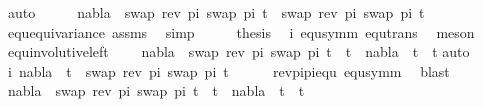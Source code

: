 \begin{isabellebody}
\ auto\isanewline
\ \ \isamarkupfalse%
\ \isamarkupfalse%
\ {\isachardoublequoteopen}nabla\ {\isasymturnstile}\ swap\ {\isacharparenleft}{\kern0pt}rev\ pi{\isacharparenright}{\kern0pt}\ {\isacharparenleft}{\kern0pt}swap\ pi\ t{}{\isacharparenright}{\kern0pt}\ {\isasymapprox}\ swap\ {\isacharparenleft}{\kern0pt}rev\ pi{\isacharparenright}{\kern0pt}\ {\isacharparenleft}{\kern0pt}swap\ pi\ t{}{\isacharparenright}{\kern0pt}{\isachardoublequoteclose}\isanewline
\ \ \ \ \isamarkupfalse%
\ equ{\isacharunderscore}{\kern0pt}equivariance\ assms\ \isamarkupfalse%
\ simp\isanewline
\ \ \isamarkupfalse%
\ \isamarkupfalse%
\ {\isacharquery}{\kern0pt}thesis\ \isamarkupfalse%
\ i\ equ{\isacharunderscore}{\kern0pt}symm\ equ{\isacharunderscore}{\kern0pt}trans\ \isamarkupfalse%
\ meson\ \isanewline
{}\isamarkupfalse%
%
\endisatagproof
{\isafoldproof}%
%
\isadelimproof
\isanewline
%
\endisadelimproof
\isanewline
{}\isamarkupfalse%
\ equ{\isacharunderscore}{\kern0pt}involutive{\isacharunderscore}{\kern0pt}left{\isacharcolon}{\kern0pt}\ \isanewline
\ \ \ {\isachardoublequoteopen}nabla\ {\isasymturnstile}\ swap\ {\isacharparenleft}{\kern0pt}rev\ pi{\isacharparenright}{\kern0pt}\ {\isacharparenleft}{\kern0pt}swap\ pi\ t{}{\isacharparenright}{\kern0pt}\ {\isasymapprox}\ t{}\ {\isacharequal}{\kern0pt}\ nabla\ {\isasymturnstile}\ t{}\ {\isasymapprox}\ t{}{\isachardoublequoteclose}\isanewline
%
\isadelimproof
%
\endisadelimproof
%
\isatagproof
{}\isamarkupfalse%
{\isacharparenleft}{\kern0pt}auto{\isacharparenright}{\kern0pt}\isanewline
\ \ \isamarkupfalse%
\ i{\isacharcolon}{\kern0pt}\ {\isachardoublequoteopen}nabla\ {\isasymturnstile}\ t{}\ {\isasymapprox}\ swap\ {\isacharparenleft}{\kern0pt}rev\ pi{\isacharparenright}{\kern0pt}\ {\isacharparenleft}{\kern0pt}swap\ pi\ t{}{\isacharparenright}{\kern0pt}{\isachardoublequoteclose}\isanewline
\ \ \ \ \isamarkupfalse%
\ rev{\isacharunderscore}{\kern0pt}pi{\isacharunderscore}{\kern0pt}pi{\isacharunderscore}{\kern0pt}equ\ equ{\isacharunderscore}{\kern0pt}symm\ \isamarkupfalse%
\ blast\isanewline
\ \ \isamarkupfalse%
\ {\isachardoublequoteopen}nabla\ {\isasymturnstile}\ swap\ {\isacharparenleft}{\kern0pt}rev\ pi{\isacharparenright}{\kern0pt}\ {\isacharparenleft}{\kern0pt}swap\ pi\ t{}{\isacharparenright}{\kern0pt}\ {\isasymapprox}\ t{}\ {\isasymLongrightarrow}\ nabla\ {\isasymturnstile}\ t{}\ {\isasymapprox}\ t{}{\isachardoublequoteclose}\isanewline

\end{isabellebody}
